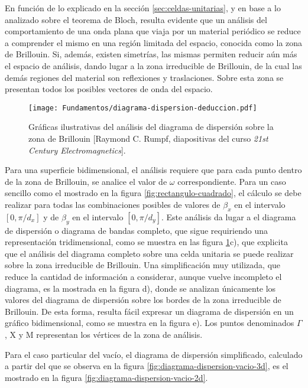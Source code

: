 En función de lo explicado en la sección \ref{sec:celdas-unitarias}, y en base a lo analizado sobre el teorema de Bloch, resulta evidente que un análisis del comportamiento de una onda plana que viaja por un material periódico se reduce a comprender el mismo en una región limitada del espacio, conocida como la zona de Brillouin. Si, además, existen simetrías, las mismas permiten reducir aún más el espacio de análisis, dando lugar a la zona irreducible de Brillouin, de la cual las demás regiones del material son reflexiones y traslaciones. Sobre esta zona se presentan todos los posibles vectores de onda del espacio.

\begin{figure}[h]
	\centering
	\texttt{[image: Fundamentos/diagrama-dispersion-deduccion.pdf]}
	\caption{Gráficas ilustrativas del análisis del diagrama de dispersión sobre la zona de Brillouin [Raymond C. Rumpf, diapositivas del curso \textit{21st Century Electromagnetics}].}
	\label{fig:diagrama-dispersion-completo-deduccion}
\end{figure}

Para una superficie bidimensional, el análisis requiere que para cada punto dentro de la zona de Brillouin, se analice el valor de $\omega$ correspondiente. Para un caso sencillo como el mostrado en la figura \ref{fig:rectangulo-cuadrado}, el cálculo se debe realizar para todas las combinaciones posibles de valores de $\beta_x$ en el intervalo $[0,\pi/d_x]$ y de $\beta_y$ en el intervalo $[0,\pi/d_y]$. Este análisis da lugar a el diagrama de dispersión o diagrama de bandas completo, que sigue requiriendo una representación tridimensional, como se muestra en las figura \ref{fig:diagrama-dispersion-completo-deduccion}c), que explicita que el análisis del diagrama completo sobre una celda unitaria se puede realizar sobre la zona irreducible de Brillouin. Una simplificación muy utilizada, que reduce la cantidad de información a considerar, aunque vuelve incompleto el diagrama, es la mostrada en la figura d), donde se analizan únicamente los valores del diagrama de dispersión sobre los bordes de la zona irreducible de Brillouin. De esta forma, resulta fácil expresar un diagrama de dispersión en un gráfico bidimensional, como se muestra en la figura e). Los puntos denominados $\Gamma$, X y M representan los vértices de la zona de análisis.

Para el caso particular del vacío, el diagrama de dispersión simplificado, calculado a partir del que se observa en la figura \ref{fig:diagrama-dispersion-vacio-3d}, es el mostrado en la figura \ref{fig:diagrama-dispersion-vacio-2d}.


